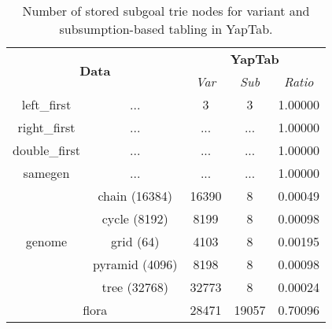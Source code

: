 \begin{table}[ht]
\centering
\small{
  \begin{tabular}{cc|ccc}
   \hline
    \hline
    \multicolumn{2}{c|}{\multirow{2}{*}{\normalsize{\textbf{Data}}}} & \multicolumn{3}{c}{\normalsize{\textbf{YapTab}}} \\
     \multicolumn{2}{c|}{} & \textit{\small{Var}} & \textit{\small{Sub}} & \textit{\small{Ratio}} \\
   \hline
   \hline

   left\_first &  \footnotesize{...} &  3 & 3 & 1.00000 \\
   \hline
   right\_first &  \footnotesize{...} &  ... & ... &  1.00000 \\
   \hline
double\_first &  \footnotesize{...} &  ... & ... &  1.00000 \\
\hline

samegen & \footnotesize{...} &  ... & ... &  1.00000 \\
\hline
\multirow{5}{*}{genome} &  \footnotesize{chain (16384)} &  16390 & 8 &  0.00049 \\
&  \footnotesize{cycle (8192)} &  8199 & 8 &  0.00098 \\
&  \footnotesize{grid (64)} &  4103 & 8 &  0.00195 \\
&  \footnotesize{pyramid (4096)} &  8198 & 8 &  0.00098 \\
&  \footnotesize{tree (32768)} &  32773 & 8 &  0.00024 \\
\hline

\multicolumn{2}{c|}{flora} & 28471 & 19057 & 0.70096 \\
\hline 
\hline
\end{tabular}
}
\caption{Number of stored subgoal trie nodes for variant and subsumption-based tabling in YapTab.}
\label{tbl:results_detail_space_sub_subgoal}
\end{table}
